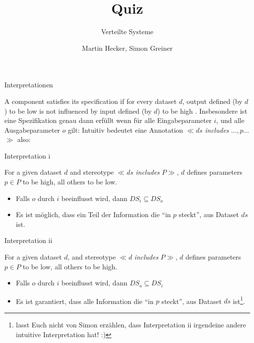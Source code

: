 \documentclass[18pt]{beamer}
\title{Quiz}
\subtitle{Verteilte Systeme}
\author{Martin Hecker, Simon Greiner}
\institute{Kompetenzzentrum für angewandte Sicherheitstechnologie}
\newcommand{\kit}[1]{\textcolor{kit-green100}{#1}}
\newcommand{\stereo}[1]{$\ll$#1$\gg$\xspace}
\newcommand{\includesstereo}[2]{\stereo{$#1$ \emph{includes} $#2$}}
\begin{document}


\AtBeginSection{\frame{\sectionpage}}

\begin{frame}
\titlepage
\end{frame}



\begin{frame}[fragile,t]{Interpretationen}

\begin{overprint}
A component satisfies its specification if for every dataset $d$, output defined (by $d$) to be {\color{blue} low} is not influenced
by input defined (by $d$) to be {\color{red} high} .
Insbesondere ist eine Spezifikation genau dann erfüllt wenn für alle Eingabeparameter $i$, und alle Ausgabeparameter $o$ gilt:
Intuitiv bedeutet eine Annotation \includesstereo{ds}{\ldots, p \ldots} also:
\end{overprint}

\vfill

\kit{Interpretation i}
\begin{overprint}
For a given dataset $d$ and stereotype \includesstereo{ds}{P},
$d$ defines parameters $p \in P$ to be {\color{red} high},  all others to be  {\color{blue} low}.
\begin{itemize}
  \item Falls $o$ durch $i$ beeinflusst wird, dann  $DS_i \subseteq DS_o$
\end{itemize}
\begin{itemize}
  \item Es ist möglich,    dass ein Teil der Information die \enquote{in $p$ steckt}, aus Dataset $ds$ ist.
\end{itemize}
\end{overprint}

\vfill

\kit{Interpretation ii}
\begin{overprint}
For a given dataset $d$, and stereotype \includesstereo{d}{P},
$d$ defines parameters $p \in P$ to be {\color{blue} low},  all others to be  {\color{red} high}.
\begin{itemize}
  \item Falls $o$ durch $i$ beeinflusst wird, dann  $DS_o \subseteq DS_i$
\end{itemize}
\begin{itemize}
   \item Es ist garantiert, dass alle Information         die \enquote{in $p$ steckt}, aus Dataset $ds$ ist\footnote{lasst Euch nicht von Simon erzählen, dass Interpretation ii irgendeine andere intuitive Interpretation hat! :)}.
\end{itemize}
\end{overprint}


\end{frame}
\end{document}
